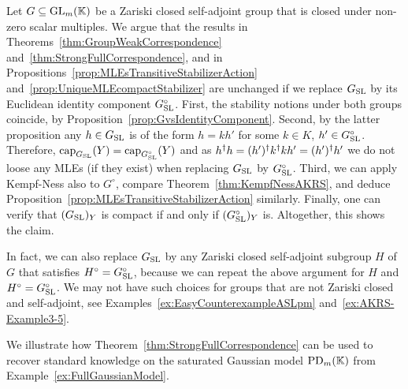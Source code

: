 \begin{remark} \label{rem:ChangeGroup}
	Let $G \subseteq \operatorname{GL}_m(\mathbb K)$ be a Zariski closed self-adjoint group that is closed under non-zero scalar multiples. We argue that the results in Theorems~\ref{thm:GroupWeakCorrespondence} and~\ref{thm:StrongFullCorrespondence}, and in Propositions~\ref{prop:MLEsTransitiveStabilizerAction} and~\ref{prop:UniqueMLEcompactStabilizer} are unchanged if we replace $G_{\operatorname{SL}}$ by its Euclidean identity component $G_{\operatorname{SL}}^\circ$. First, the stability notions under both groups coincide, by Proposition~\ref{prop:GvsIdentityComponent}. Second, by the latter proposition any $h \in G_{\operatorname{SL}}$ is of the form $h = kh'$ for some $k \in K$, $h' \in G_{\operatorname{SL}}^\circ$. Therefore, $\operatorname{cap}_{G_{\operatorname{SL}}} (Y) = \operatorname{cap}_{G_{\operatorname{SL}}^\circ}(Y)$ and as $h^{\dagger} h = (h')^{\dagger} k^{\dagger} k h' = (h')^{\dagger} h'$ we do not loose any MLEs (if they exist) when replacing $G_{\operatorname{SL}}$ by $G_{\operatorname{SL}}^\circ$. Third, we can apply Kempf-Ness also to $G^\circ$, compare Theorem~\ref{thm:KempfNessAKRS}, and deduce Proposition~\ref{prop:MLEsTransitiveStabilizerAction} similarly. Finally, one can verify that $(G_{\operatorname{SL}})_Y$ is compact if and only if $(G_{\operatorname{SL}}^\circ)_Y$ is. Altogether, this shows the claim.
	
	In fact, we can also replace $G_{\operatorname{SL}}$ by any Zariski closed self-adjoint subgroup $H$ of $G$ that satisfies $H^\circ = G_{\operatorname{SL}}^\circ$, because we can repeat the above argument for $H$ and $H^\circ = G_{\operatorname{SL}}^\circ$. We may not have such choices for groups that are not Zariski closed and self-adjoint, see Examples~\ref{ex:EasyCounterexampleASLpm} and~\ref{ex:AKRS-Example3-5}.
	\hfill\remSymbol	
\end{remark}

We illustrate how Theorem~\ref{thm:StrongFullCorrespondence} can be used to recover standard knowledge on the saturated Gaussian model $\operatorname{PD}_m(\mathbb K)$ from Example~\ref{ex:FullGaussianModel}.


